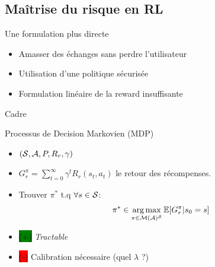 \documentclass[french,handout]{beamer}
\newcommand{\cplus}{\colorbox{green}{(+)} }
\newcommand{\cmoins}{\colorbox{red}{(-)} }
\begin{document}
    \subsection{Maîtrise du risque en RL}

    \begin{frame}{Une formulation plus directe}

        \begin{itemize}
            \item Amasser des échanges sans perdre l'utilisateur%
            \item Utilisation d'une politique sécurisée %
            \item Formulation linéaire de la reward insuffisante
        \end{itemize}


    \end{frame}

    \begin{frame}{Cadre}
        \begin{block}{Processus de Decision Markovien (MDP)}
            \begin{itemize}
                \pause\item $(\mathcal{S}, \mathcal{A}, P, R_r, \gamma)$
                \pause\item $G_r^\pi = \sum_{t=0}^\infty \gamma^t R_r(s_t, a_t)$ le retour des récompenses.
                \pause\item Trouver $\pi^*$ t.q $\forall s\in\mathcal{S}$:
                \begin{equation}
                    \label{eq:mdp}
                    \begin{array}{lcr}
                        \displaystyle \pi^* \in \operatorname*{arg\,max}_{\pi\in\mathcal{M}(\mathcal{A})^{\mathcal{S}}} \operatorname*{\mathbb{E}}[G_r^\pi | s_0=s]
                    \end{array}
                \end{equation}

            \end{itemize}
        \end{block}


        \begin{block}{}
            \begin{itemize}
                \item \cplus \textit{Tractable}
                \item \cmoins Calibration nécessaire (quel $\lambda$ ?)
            \end{itemize}
        \end{block}

    \end{frame}
\end{document}
